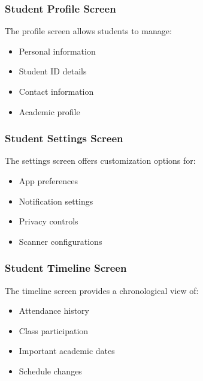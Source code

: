 \subsubsection{Student Profile Screen}
The profile screen allows students to manage:
\begin{itemize}
    \item Personal information
    \item Student ID details
    \item Contact information
    \item Academic profile
\end{itemize}

\subsubsection{Student Settings Screen}
The settings screen offers customization options for:
\begin{itemize}
    \item App preferences
    \item Notification settings
    \item Privacy controls
    \item Scanner configurations
\end{itemize}

\subsubsection{Student Timeline Screen}
The timeline screen provides a chronological view of:
\begin{itemize}
    \item Attendance history
    \item Class participation
    \item Important academic dates
    \item Schedule changes
\end{itemize}